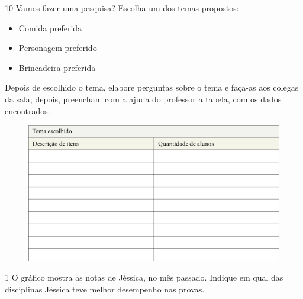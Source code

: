 
\num{10} Vamos fazer uma pesquisa? Escolha um dos temas propostos:

\begin{itemize}
\item
  Comida preferida
\item
  Personagem preferido
\item
  Brincadeira preferida
\end{itemize}

\pagebreak
Depois de escolhido o tema, elabore perguntas sobre o tema e faça-as aos colegas da sala; depois,
preencham com a ajuda do professor a tabela, com os dados encontrados.

\begin{figure}[htpb!]
\includegraphics[width=\textwidth]{./media/image98.png}
\end{figure}






\num{1} O gráfico mostra as notas de Jéssica, no mês passado. Indique em
qual das disciplinas Jéssica teve melhor desempenho nas provas.

